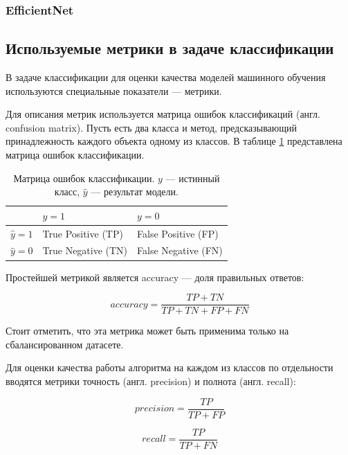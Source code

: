 \documentclass[a4paper,12pt]{extarticle}
\begin{document}
\subsubsection{EfficientNet}


\subsection{Используемые метрики в задаче классификации}
В задаче классификации для оценки качества моделей машинного обучения используются специальные показатели — метрики.

Для описания метрик используется матрица ошибок классификаций (англ. confusion matrix). Пусть есть два класса и метод, предсказывающий принадлежность каждого объекта одному из классов. В таблице \ref{confusion_matr} представлена матрица ошибок классификации.

\begin{table}[h]
	\centering
	\begin{tabular}{ | l | l | l | }
		\hline
		& $y = 1$ & $y = 0$ \\ \hline
		$\hat{y} = 1$ & True Positive (TP) & False Positive (FP) \\ \hline
		$\hat{y} = 0$ & True Negative (TN) & False Negative (FN) \\ \hline
	\end{tabular}
	\caption{Матрица ошибок классификации.
		$y$ — истинный класс, $\hat{y}$ — результат модели.}
	\label{confusion_matr}
\end{table}

Простейшей метрикой является accuracy — доля правильных ответов:

\begin{equation}
	\label{acc}
	accuracy = \frac{TP + TN}{TP + TN + FP + FN}
\end{equation}

Стоит отметить, что эта метрика может быть применима только на сбалансированном датасете. 


Для оценки качества работы алгоритма на каждом из классов по отдельности вводятся метрики точность (англ. precision)  и полнота (англ. recall): 

\begin{equation}
	\label{precision}
	precision = \frac{TP}{TP + FP}
\end{equation}

\begin{equation}
	\label{recall}
	recall = \frac{TP}{TP + FN}
\end{equation}
\end{document}
